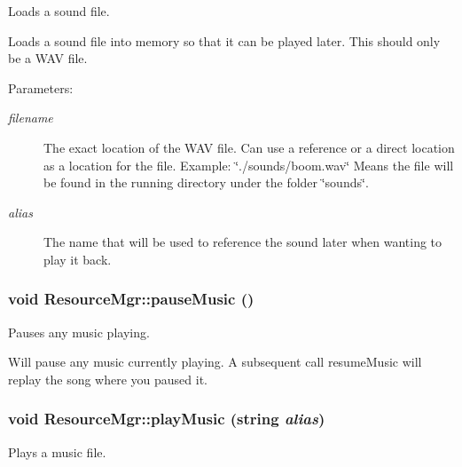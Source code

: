 Loads a sound file. 

Loads a sound file into memory so that it can be played later. This should only be a WAV file. \begin{Desc}
\item[Parameters:]
\begin{description}
\item[{\em filename}]The exact location of the WAV file. Can use a reference or a direct location as a location for the file. Example: \char`\"{}./sounds/boom.wav\char`\"{} Means the file will be found in the running directory under the folder \char`\"{}sounds\char`\"{}. \item[{\em alias}]The name that will be used to reference the sound later when wanting to play it back. \end{description}
\end{Desc}
\hypertarget{class_resource_mgr_f3b6d92284ff1e5e9238adbf810cbd48}{
\subsubsection[{pauseMusic}]{\setlength{\rightskip}{0pt plus 5cm}void ResourceMgr::pauseMusic ()}}
\label{class_resource_mgr_f3b6d92284ff1e5e9238adbf810cbd48}


Pauses any music playing. 

Will pause any music currently playing. A subsequent call resumeMusic will replay the song where you paused it. \hypertarget{class_resource_mgr_27e40623d8659a8ee488550a4f79913e}{
\subsubsection[{playMusic}]{\setlength{\rightskip}{0pt plus 5cm}void ResourceMgr::playMusic (string {\em alias})}}
\label{class_resource_mgr_27e40623d8659a8ee488550a4f79913e}


Plays a music file. 


